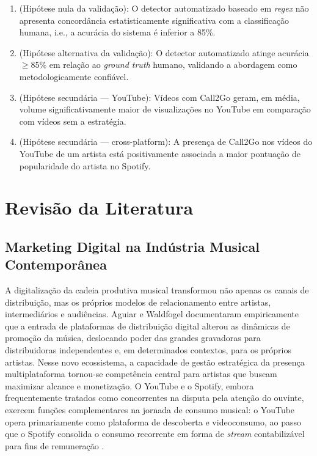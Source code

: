 \documentclass[12pt, a4paper]{article}
\begin{document}
\begin{enumerate}
    \item[$H_0$] (Hipótese nula da validação): O detector automatizado baseado em \textit{regex} não apresenta concordância estatisticamente significativa com a classificação humana, i.e., a acurácia do sistema é inferior a 85\%.
    \item[$H_1$] (Hipótese alternativa da validação): O detector automatizado atinge acurácia $\geq 85\%$ em relação ao \textit{ground truth} humano, validando a abordagem como metodologicamente confiável.
    \item[$H_2$] (Hipótese secundária --- YouTube): Vídeos com Call2Go geram, em média, volume significativamente maior de visualizações no YouTube em comparação com vídeos sem a estratégia.
    \item[$H_3$] (Hipótese secundária --- cross-platform): A presença de Call2Go nos vídeos do YouTube de um artista está positivamente associada a maior pontuação de popularidade do artista no Spotify.
\end{enumerate}

\section{Revisão da Literatura}
\label{sec:literatura}

\subsection{Marketing Digital na Indústria Musical Contemporânea}

A digitalização da cadeia produtiva musical transformou não apenas os canais de distribuição, mas os próprios modelos de relacionamento entre artistas, intermediários e audiências. Aguiar e Waldfogel \cite{aguiar2018} documentaram empiricamente que a entrada de plataformas de distribuição digital alterou as dinâmicas de promoção da música, deslocando poder das grandes gravadoras para distribuidoras independentes e, em determinados contextos, para os próprios artistas. Nesse novo ecossistema, a capacidade de gestão estratégica da presença multiplataforma tornou-se competência central para artistas que buscam maximizar alcance e monetização. O YouTube e o Spotify, embora frequentemente tratados como concorrentes na disputa pela atenção do ouvinte, exercem funções complementares na jornada de consumo musical: o YouTube opera primariamente como plataforma de descoberta e videoconsumo, ao passo que o Spotify consolida o consumo recorrente em forma de \textit{stream} contabilizável para fins de remuneração \cite{wlomert2016}.
\end{document}
